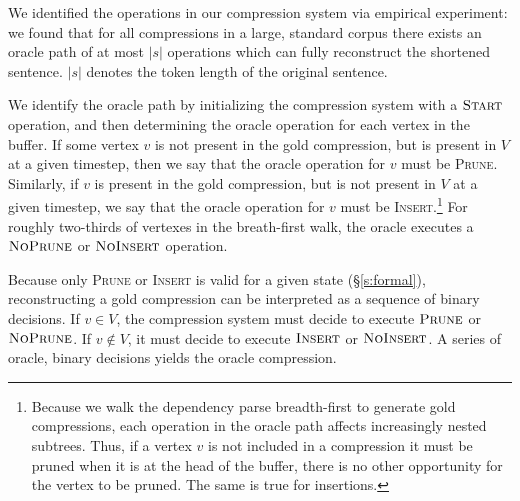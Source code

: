 \documentclass[11pt,a4paper]{article}
\begin{document}
We identified the operations in our compression system via empirical experiment: we found that for all compressions in a large, standard corpus \cite{filippova2013overcoming} there exists an oracle path of at most $|s|$ operations which can fully reconstruct the shortened sentence. $|s|$ denotes the token length of the original sentence.

We identify the oracle path by initializing the compression system with a $\textsc{Start}$ operation, and then determining the oracle operation for each vertex in the buffer. If some vertex $v$ is not present in the gold compression, but is present in ${V}$ at a given timestep, then we say that the oracle operation for $v$ must be \textsc{Prune}. Similarly, if $v$ is present in the gold compression, but is not present in ${V}$ at a given timestep, we say that the oracle operation for $v$ must be \textsc{Insert}.\footnote{Because we walk the dependency parse breadth-first to generate gold compressions, each operation in the oracle path affects increasingly nested subtrees. Thus, if a vertex $v$ is not included in a compression it must be pruned when it is at the head of the buffer, there is no other opportunity for the vertex to be pruned. The same is true for insertions.} For roughly two-thirds of vertexes in the breath-first walk, the oracle executes a $\textsc{NoPrune}$ or $\textsc{NoInsert}$ operation.

Because only \textsc{Prune} or \textsc{Insert} is valid for a given state (\S\ref{s:formal}), reconstructing a gold compression can be interpreted as a sequence of binary decisions. If $v \in V$, the compression system must decide to execute $\textsc{Prune}$ or $\textsc{NoPrune}$. If $v \notin V$, it must decide to execute $\textsc{Insert}$ or $\textsc{NoInsert}$. A series of oracle, binary decisions yields the oracle compression.
\end{document}
